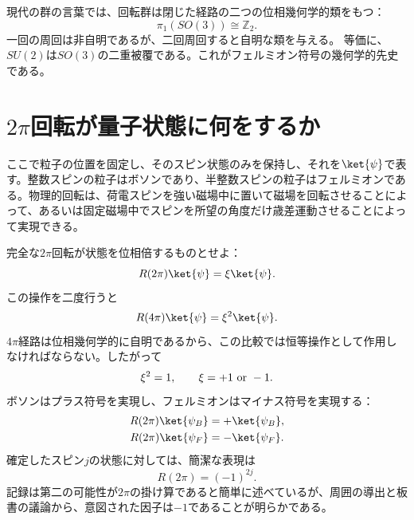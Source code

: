 \begin{classroomqa}
\end{classroomqa}

現代の群の言葉では、回転群は閉じた経路の二つの位相幾何学的類をもつ：
\begin{equation}
\pi_1\!\left(SO(3)\right)\cong \mathbb Z_2.
\end{equation}
一回の周回は非自明であるが、二回周回すると自明な類を与える。
等価に、\(SU(2)\)は\(SO(3)\)の二重被覆である。これがフェルミオン符号の幾何学的先史である。


\section{\texorpdfstring{\(2\pi\)}{2 pi}回転が量子状態に何をするか}

ここで粒子の位置を固定し、そのスピン状態のみを保持し、それを\(\ket{\psi}\)で表す。整数スピンの粒子はボソンであり、半整数スピンの粒子はフェルミオンである。物理的回転は、荷電スピンを強い磁場中に置いて磁場を回転させることによって、あるいは固定磁場中でスピンを所望の角度だけ歳差運動させることによって実現できる。

\begin{classroomqa}
\end{classroomqa}

完全な\(2\pi\)回転が状態を位相倍するものとせよ：
\begin{equation}
R(2\pi)\ket{\psi}=\xi\ket{\psi}.
\end{equation}
この操作を二度行うと
\begin{equation}
R(4\pi)\ket{\psi}=\xi^2\ket{\psi}.
\end{equation}
\(4\pi\)経路は位相幾何学的に自明であるから、この比較では恒等操作として作用しなければならない。したがって
\begin{equation}
\xi^2=1,
\qquad
\xi=+1\ \hbox{or}\ -1.
\end{equation}
ボソンはプラス符号を実現し、フェルミオンはマイナス符号を実現する：
\begin{align}
R(2\pi)\ket{\psi_B}&=+\ket{\psi_B},\\
R(2\pi)\ket{\psi_F}&=-\ket{\psi_F}.
\end{align}
確定したスピン\(j\)の状態に対しては、簡潔な表現は
\begin{equation}
R(2\pi)=(-1)^{2j}.
\end{equation}
記録は第二の可能性が\(2\pi\)の掛け算であると簡単に述べているが、周囲の導出と板書の議論から、意図された因子は\(-1\)であることが明らかである。

